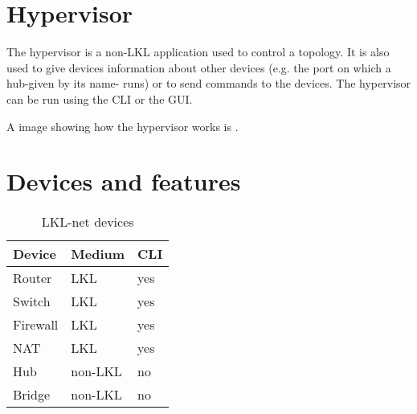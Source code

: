 \section{Hypervisor}
\label{sub-sec:hypervisor}
The hypervisor is a non-LKL application used to control a topology. It is also used to give devices information 
about other devices (e.g. the port on which a hub-given by its name- runs) or to send commands to the devices. 
The hypervisor can be run using the CLI or the GUI.

A image showing how the hypervisor works is . 

\section{Devices and features}
\begin{center}
  \begin{table}[htb]
  \begin{center}
  \begin{tabular}{ | l | l | l |}
    \hline
      Device & Medium & CLI\\ \hline
      Router & LKL & yes \\ \hline
      Switch & LKL & yes\\ \hline
      Firewall & LKL & yes\\ \hline
      NAT & LKL & yes\\ \hline
      Hub & non-LKL & no\\ \hline
      Bridge & non-LKL & no\\ 
    \hline
  \end{tabular}
  \end{center}
  \caption{LKL-net devices}
  \label{table:tdevices}
  \end{table}
\end{center}
